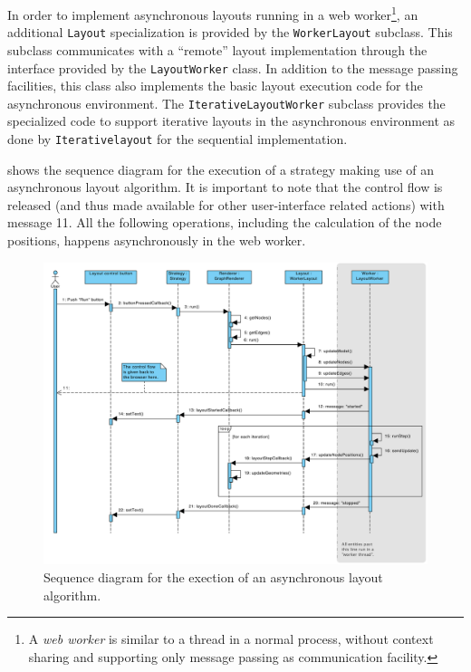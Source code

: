 In order to implement asynchronous layouts running in a web worker\footnote{A \emph{web worker} is similar to a thread in a normal process, without context sharing and supporting only message passing as communication facility.}, an additional \texttt{Layout} specialization is provided by the \texttt{WorkerLayout} subclass. This subclass communicates with a ``remote'' layout implementation through the interface provided by the \texttt{LayoutWorker} class. In addition to the message passing facilities, this class also implements the basic layout execution code for the asynchronous environment. The \texttt{IterativeLayoutWorker} subclass provides the specialized code to support iterative layouts in the asynchronous environment as done by \texttt{Iterativelayout} for the sequential implementation.

 shows the sequence diagram for the execution of a strategy making use of an asynchronous layout algorithm. It is important to note that the control flow is released (and thus made available for other user-interface related actions) with message 11. All the following operations, including the calculation of the node positions, happens asynchronously in the web worker. 

\begin{figure}
  \begin{adjustwidth}{-4.7mm}{-1.5cm}  
  \includegraphics[width=\linewidth]{images/diagrams/seq-execute-layout}
\end{adjustwidth}
  \caption[Sequence diagram for the execution of an asynchronous layout.]{Sequence diagram for the exection of an asynchronous layout algorithm.}
  \label{fig:seq-execute-layout}
\end{figure}


